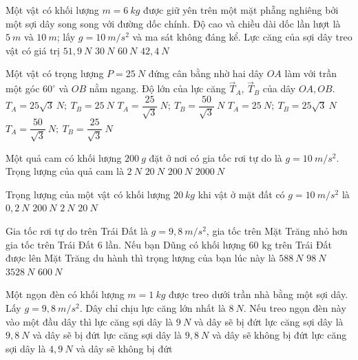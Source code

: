 \begin{ex}%
Một vật có khối lượng $m=6\ kg$ được giữ yên trên một mặt phẵng nghiêng bởi một sợi dây song song với đường dốc chính. Độ cao và chiều dài dốc lần lượt là $5\ m$ và $10\ m$; lấy $g=10\ m / s^{2}$ và ma sát không đáng kể. Lực căng của sợi dây treo vật có giá trị
\choice
{$51,9\ N$}
{\True $30\ N$}
{$60\ N$}
{$42,4\ N$}

 \end{ex}
\begin{ex}%
Một vật có trọng lượng $P=25\ N$ đứng cân bằng nhờ hai dây $OA$ làm với trần một góc $60^{\circ}$ và $OB$ nằm ngang. Độ lớn của lực căng $\vec{T}_{A}$, $\vec{T}_{B}$ của dây $OA, OB$.
\choice
{$T_{A}=25 \sqrt{3}\ N ;\ T_{B}=25\ N$}
{$T_{A}=\dfrac{25}{\sqrt{3}}\ N ;\ T_{B}=\dfrac{50}{\sqrt{3}}\ N$}
{$T_{A}=25\ N ;\ T_{B}=25 \sqrt{3}\ N$}
{\True $T_{A}=\dfrac{50}{\sqrt{3}}\ N ;\ T_{B}=\dfrac{25}{\sqrt{3}}\ N$}	
 \end{ex}
\begin{ex}%
Một quả cam có khối lượng $200 \ g$ đặt ở nơi có gia tốc rơi tự do là $g=10 \ m / s^2$. Trọng lượng của quả cam là
\choice
{\True $2 \ N$}
{\True $20 \ N$}
{$200 \ N$}
{$2000 \ N$}
 \end{ex}
\begin{ex}%
Trọng lượng của một vật có khối lượng $20\ kg$ khi vật ở mặt đất có $g = 10\ m/s^2$ là
\choice
{$0,2\ N$}
{\True $200\ N$}
{$2\ N$}
{$20\ N$}
 \end{ex}
\begin{ex}%
Gia tốc rơi tự do trên Trái Đất là $g=9,8\ m/s^2$, gia tốc trên Mặt Trăng nhỏ hơn gia tốc trên Trái Đất $6$ lần. Nếu bạn Dũng có khối lượng 60 kg trên Trái Đất được lên Mặt Trăng du hành thì trọng lượng của bạn lúc này là
\choice
{$588 \ N$}
{\True $98 \ N$}
{$3528 \ N$}
{$600 \ N$}
 \end{ex}
\begin{ex}%
Một ngọn đèn có khối lượng $m=1 \ kg$ được treo dưới trần nhà bằng một sợi dây. Lấy $g=9,8\ m/s^2$. Dây chỉ chịu lực căng lớn nhất là $8 \ N$. Nếu treo ngọn đèn này vào một đầu dây thì
\choice
{lực căng sợi dây là $9 \ N$ và dây sẽ bị đứt}
{\True lực căng sợi dây là $9,8 \ N$ và dây sẽ bị đứt}
{lực căng sợi dây là $9,8 \ N$ và dây sẽ không bị đứt}
{lực căng sợi dây là $4,9 \ N$ và dây sẽ không bị đứt}
 \end{ex}
